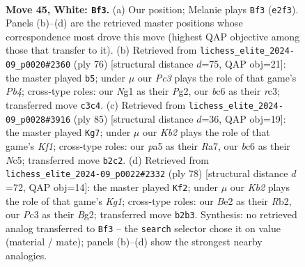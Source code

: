 \documentclass[11pt]{article}
\begin{document}
\clearpage

\begin{figure}[p]\centering
\begin{subfigure}{0.46\textwidth}\centering
\resizebox{\linewidth}{!}{%
\newchessgame
\chessboard[
  setfen={1r6/4r3/1pb4k/p1p1n3/6p1/2P3P1/1K1NB2P/4R1NR w - - 2 45},
  showmover=false,
  pgfstyle=straightmove, color=movearrow, markmove={e2-f3}
]}
\caption{}
\end{subfigure}\hfill
\begin{subfigure}{0.46\textwidth}\centering
\resizebox{\linewidth}{!}{%
\newchessgame
\chessboard[
  setfen={8/1bk2p2/1n1np1p1/7p/1P5P/2r1N3/R2NBPPK/8 w - - 15 39},
  showmover=false,
  pgfstyle=straightmove, color=movearrow, markmove={b4-b5}
]}
\caption{}
\end{subfigure}
\\[4pt]
\begin{subfigure}{0.46\textwidth}\centering
\resizebox{\linewidth}{!}{%
\newchessgame
\chessboard[
  setfen={5k2/r1b2p2/2r3p1/2n4p/2Np3P/3P2P1/1RB2PK1/2R5 b - - 16 43},
  showmover=false,
  pgfstyle=straightmove, color=movearrow, markmove={f8-g7}
]}
\caption{}
\end{subfigure}\hfill
\begin{subfigure}{0.46\textwidth}\centering
\resizebox{\linewidth}{!}{%
\newchessgame
\chessboard[
  setfen={8/6k1/2b4p/2pNPp2/2Pn1P2/3r3P/1R4B1/6K1 w - - 2 40},
  showmover=false,
  pgfstyle=straightmove, color=movearrow, markmove={g1-f2}
]}
\caption{}
\end{subfigure}
\caption{\textbf{Move 45, White: \texttt{Bf3}.} (a) Our position; Melanie plays \texttt{Bf3} (\texttt{e2f3}). Panels (b)--(d) are the retrieved master positions whose correspondence most drove this move (highest QAP objective among those that transfer to it). (b) Retrieved from \texttt{lichess\_elite\_2024-09\_p0020\#2360} (ply 76) [structural distance $d$=75, QAP obj=21]: the master played \texttt{b5}; under $\mu$ our \emph{Pc3} plays the role of that game's \emph{Pb4}; cross-type roles: our \emph{N}g1 as their \emph{P}g2, our \emph{b}c6 as their \emph{r}c3; transferred move \texttt{c3c4}. (c) Retrieved from \texttt{lichess\_elite\_2024-09\_p0028\#3916} (ply 85) [structural distance $d$=36, QAP obj=19]: the master played \texttt{Kg7}; under $\mu$ our \emph{Kb2} plays the role of that game's \emph{Kf1}; cross-type roles: our \emph{p}a5 as their \emph{R}a7, our \emph{b}c6 as their \emph{N}c5; transferred move \texttt{b2c2}. (d) Retrieved from \texttt{lichess\_elite\_2024-09\_p0022\#2332} (ply 78) [structural distance $d$=72, QAP obj=14]: the master played \texttt{Kf2}; under $\mu$ our \emph{Kb2} plays the role of that game's \emph{Kg1}; cross-type roles: our \emph{B}e2 as their \emph{R}b2, our \emph{P}c3 as their \emph{B}g2; transferred move \texttt{b2b3}. Synthesis: no retrieved analog transferred to \texttt{Bf3} -- the \texttt{search} selector chose it on value (material / mate); panels (b)--(d) show the strongest nearby analogies.}
\label{fig:thought-m88}
\end{figure}
\end{document}
